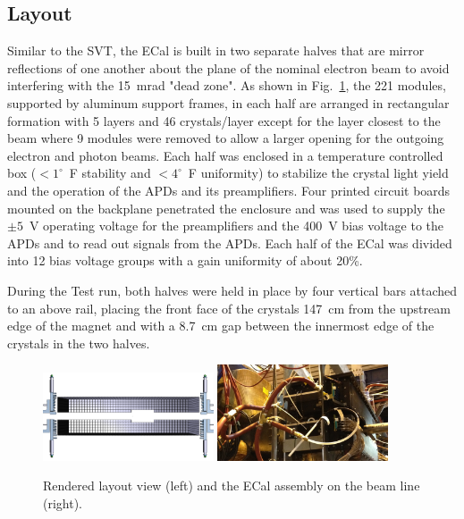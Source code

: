 \documentclass[final,3p,times,twocolumn]{elsarticle}
\begin{document}
\subsection{Layout}
Similar to the SVT, the ECal is built in two separate halves that are mirror reflections of one another 
about the plane of the nominal electron beam to avoid interfering with the 15~mrad "dead zone". 
As shown in Fig.~\ref{fig:ecal}, the 221 modules, supported by aluminum support frames, in each half 
are arranged in rectangular formation with 5 layers and 46 crystals/layer except for the layer closest to 
the beam where 9 modules were removed to allow a larger opening for the outgoing electron and 
photon beams. Each half was enclosed in a temperature controlled box ($<1^{\circ}$~F stability and 
$<4^{\circ}$~F uniformity) to stabilize the crystal light yield and the operation of the APDs and its 
preamplifiers. Four printed circuit boards mounted on the backplane penetrated the enclosure and was 
used to supply the $\pm 5$~V 
operating voltage for the preamplifiers and the 400~V bias voltage to the APDs and to read out signals 
from the APDs. Each half of the ECal was divided into 12 bias voltage groups with a gain uniformity 
of about 20\%. 

During the Test run, both halves were held in place by four vertical bars attached to an above rail, 
placing the front face of the crystals 147~cm from the upstream edge of the magnet and with a 
8.7~cm gap between the innermost edge of the crystals in the two halves.
\begin{center}
{\small
\begin{figure}[htb]
\includegraphics[width=0.45\textwidth]{figures/ECal}
\includegraphics[width=0.45\textwidth]{figures/ecal_picture_beamline}
\caption{Rendered layout view (left) and the ECal assembly on the beam line (right).}
\label{fig:ecal}
\end{figure}
}
\end{center}
\end{document}
